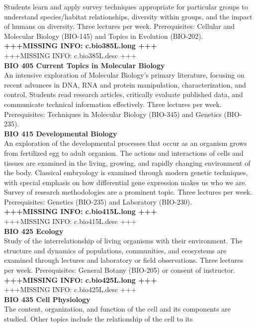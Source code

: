 \documentclass[
  letterpaper,
]{scrbook}
\begin{document}
Students learn and apply survey techniques appropriate for particular
groups to understand species/habitat relationships, diversity within
groups, and the impact of humans on diversity. Three lectures per week.
Prerequisites: Cellular and Molecular Biology (BIO-145) and Topics in
Evolution (BIO-202).\\
\textbf{+++MISSING INFO: c.bio385L.long +++}\\
+++MISSING INFO: c.bio385L.desc +++\\
\textbf{BIO 405 Current Topics in Molecular Biology}\\
An intensive exploration of Molecular Biology's primary literature,
focusing on recent advances in DNA, RNA and protein manipulation,
characterization, and control. Students read research articles,
critically evaluate published data, and communicate technical
information effectively. Three lectures per week. Prerequisites:
Techniques in Molecular Biology (BIO-345) and Genetics (BIO-235).\\
\textbf{BIO 415 Developmental Biology}\\
An exploration of the developmental processes that occur as an organism
grows from fertilized egg to adult organism. The actions and
interactions of cells and tissues are examined in the living, growing,
and rapidly changing environment of the body. Classical embryology is
examined through modern genetic techniques, with special emphasis on how
differential gene expression makes us who we are. Survey of research
methodologies are a prominent topic. Three lectures per week.
Prerequisites: Genetics (BIO-235) and Laboratory (BIO-230).\\
\textbf{+++MISSING INFO: c.bio415L.long +++}\\
+++MISSING INFO: c.bio415L.desc +++\\
\textbf{BIO 425 Ecology}\\
Study of the interrelationship of living organisms with their
environment. The structure and dynamics of populations, communities, and
ecosystems are examined through lectures and laboratory or field
observations. Three lectures per week. Prerequisites: General Botany
(BIO-205) or consent of instructor.\\
\textbf{+++MISSING INFO: c.bio425L.long +++}\\
+++MISSING INFO: c.bio425L.desc +++\\
\textbf{BIO 435 Cell Physiology}\\
The content, organization, and function of the cell and its components
are studied. Other topics include the relationship of the cell to its
\end{document}
